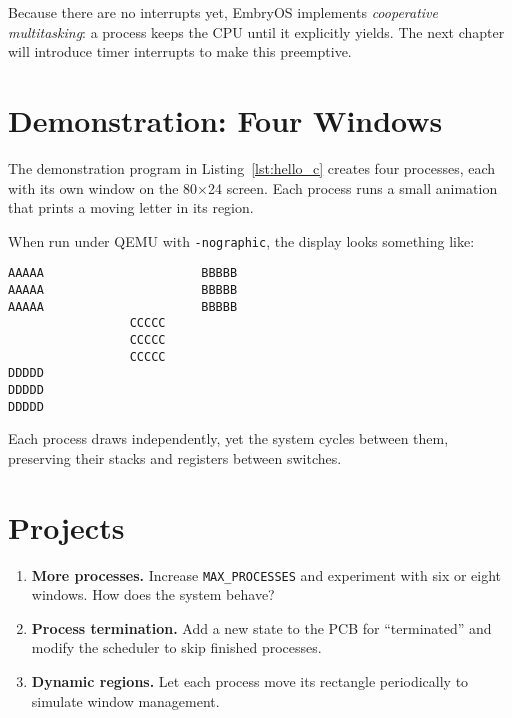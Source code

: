 Because there are no interrupts yet, EmbryOS implements
\emph{cooperative multitasking}: a process keeps the CPU until it explicitly
yields.  The next chapter will introduce timer interrupts to make this
preemptive.

\section{Demonstration: Four Windows}

The demonstration program in Listing~\ref{lst:hello_c} creates four processes,
each with its own window on the 80$\times$24 screen.  Each process runs a small
animation that prints a moving letter in its region.

\begin{figure}[H]
\centering
\begin{minipage}{0.9\textwidth}

\end{minipage}
\end{figure}

When run under QEMU with \texttt{-nographic}, the display looks something like:

\begin{verbatim}
AAAAA                      BBBBB
AAAAA                      BBBBB
AAAAA                      BBBBB
                 CCCCC
                 CCCCC
                 CCCCC
DDDDD
DDDDD
DDDDD
\end{verbatim}

Each process draws independently, yet the system cycles between them,
preserving their stacks and registers between switches.

\section*{Projects}

\begin{enumerate}
  \item \textbf{More processes.}
        Increase \texttt{MAX\_PROCESSES} and experiment with six or eight
        windows.  How does the system behave?
  \item \textbf{Process termination.}
        Add a new state to the PCB for ``terminated'' and modify the scheduler
        to skip finished processes.
  \item \textbf{Dynamic regions.}
        Let each process move its rectangle periodically to simulate window
        management.
\end{enumerate}
